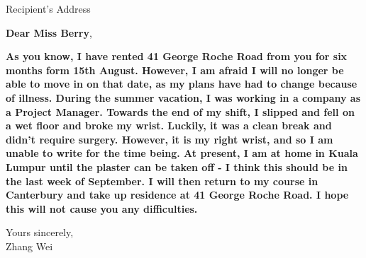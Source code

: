 \documentclass[a4paper,12pt]{letter}
\begin{document}
\address{Beijing, China}


\begin{letter}{Recipient's Address}

\opening{\textbf{Dear Miss Berry},}

\textbf{\color{red} As you know, I have rented 41 George Roche Road from you for six months form 15th August. However, I am afraid I will no longer be able to move in on that date, as my plans have had to change because of illness. During the summer vacation,  I was working in a company as a Project Manager. Towards the end of my shift, I slipped and fell on a wet floor and broke my wrist. Luckily, it was a clean break and didn't 
  require surgery. However, it is my right wrist, and so I am unable to write for the time being. At present, I am at home in Kuala Lumpur until the plaster can be taken off - I think this should be in the last week of September. I will then return to my course in Canterbury and take up residence at 41 George Roche Road. I hope this will not cause you any difficulties.}
  
  
\closing{Yours sincerely, \\ Zhang Wei}


\end{letter}
\end{document}
